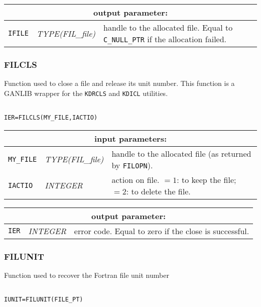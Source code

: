\vskip 0.4cm
\noindent
\begin{tabular}{|p{1.5cm}|p{3cm}|p{10cm}|}
\hline
\multicolumn{3}{|c|}{\bf output parameter:} \\
\hline
{\tt IFILE} & {\it TYPE(FIL\_file)}  & handle to the allocated file. Equal to {\tt C\_NULL\_PTR} if the allocation failed.  \\
\hline
\end{tabular}

\subsubsection{FILCLS}

Function used to close a file and release its unit number.
This function is a GANLIB wrapper for the {\tt KDRCLS} and {\tt KDICL} utilities.

\begin{verbatim}

IER=FILCLS(MY_FILE,IACTIO)
\end{verbatim}

\noindent
\begin{tabular}{|p{1.5cm}|p{3cm}|p{10cm}|}
\hline
\multicolumn{3}{|c|}{\bf input parameters:} \\
\hline
{\tt MY\_FILE} & {\it TYPE(FIL\_file)} &  handle to the allocated file (as returned by {\tt FILOPN}). \\
\hline
{\tt IACTIO} & {\it INTEGER}  & action on file.
$=1$: to keep the file;
$=2$: to delete the file.  \\
\hline
\end{tabular}

\vskip 0.4cm
\noindent
\begin{tabular}{|p{1.5cm}|p{3cm}|p{10cm}|}
\hline
\multicolumn{3}{|c|}{\bf output parameter:} \\
\hline
{\tt IER} & {\it INTEGER}  & error code. Equal to zero if the close is successful.  \\
\hline
\end{tabular}

\subsubsection{FILUNIT}

Function used to recover the Fortran file unit number

\begin{verbatim}

IUNIT=FILUNIT(FILE_PT)
\end{verbatim}

